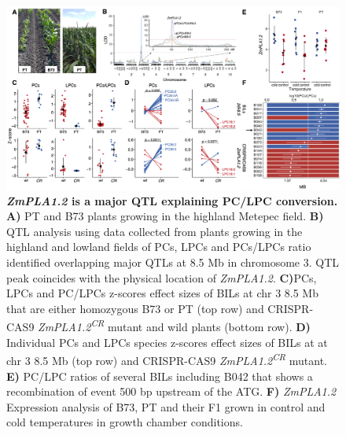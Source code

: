 \documentclass[9pt,twocolumn,twoside,lineno]{BioRxiv}
\begin{document}
\begin{figure}[!ht]
\begin{center}
\includegraphics[width=0.8\paperwidth]{Figures/Fig_3.png}
\caption{\textbf{\textit{ZmPLA1.2} is a major QTL explaining PC/LPC conversion.} 
\textbf{A)} PT and B73 plants growing in the highland Metepec field. 
\textbf{B)} QTL analysis using data collected from plants growing in the highland and lowland fields of PCs, LPCs and PCs/LPCs ratio identified overlapping major QTLs at 8.5 Mb in chromosome 3. 
QTL peak coincides with the physical location of \textit{ZmPLA1.2}. 
\textbf{C)}PCs, LPCs and PC/LPCs z-scores effect sizes of BILs at chr 3 8.5 Mb that are either homozygous B73 or PT (top row) and CRISPR-CAS9 \textit{ZmPLA1.2\textsuperscript{CR}} mutant and wild plants (bottom row).        
\textbf{D)} Individual PCs and LPCs species z-scores effect sizes of BILs at at chr 3 8.5 Mb (top row) and CRISPR-CAS9 \textit{ZmPLA1.2\textsuperscript{CR}} mutant.
\textbf{E)} PC/LPC ratios of several BILs including B042 that shows a recombination of event 500 bp upstream of the ATG.
\textbf{F)} \textit{ZmPLA1.2} Expression analysis of B73, PT and their F1 grown in control and cold temperatures in growth chamber conditions.}
\label{Fig3}
\end{center}
\end{figure} 
\end{document}
